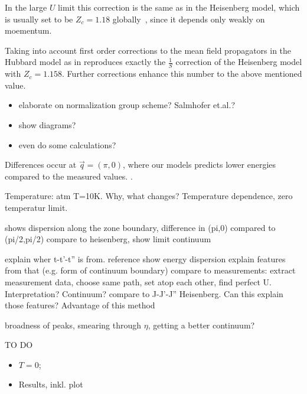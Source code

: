 \documentclass[a4paper,10pt]{report}
\begin{document}
In the large $U$ limit this correction is the same as in the Heisenberg model, which is usually set to be $Z_c=1.18$ globally~\cite{PhysRevLett.86.5377}, 
since it depends only weakly on moementum.

Taking into account first order corrections to the mean field propagators  in the Hubbard model as in \cite{PhysRevB.43.3617} 
reproduces exactly the $\frac1S$ correction of the Heisenberg model with $Z_c=1.158$.
Further corrections enhance this number to the above mentioned value.

\begin{itemize}
\item elaborate on normalization group scheme? Salmhofer et.al.\cite{RevModPhys.84.299}?
\item show diagrams?
\item even do some calculations?
\end{itemize}







Differences occur at $\vec q = (\pi,0)$, where our models predicts lower energies compared to the measured values.
.





Temperature: atm T=10K. Why, what changes? Temperature dependence, zero temperatur limit.



shows dispersion along the zone boundary,
difference in (pi,0) compared to (pi/2,pi/2)
compare to heisenberg, show limit
continuum




 explain wher t-t'-t'' is from. reference
show energy dispersion
explain features from that (e.g. form of continuum boundary)
compare to measurements: extract measurement data, choose same path, set atop each other, find perfect U. Interpretation? Continuum?
compare to J-J'-J'' Heisenberg. Can this explain those features? Advantage of this method

broadness of peaks, smearing through $\eta$, getting a better continuum?
\newpage

TO DO
\begin{itemize}
 \item $T=0$;
 \item Results, inkl. plot
\end{itemize}
\end{document}
